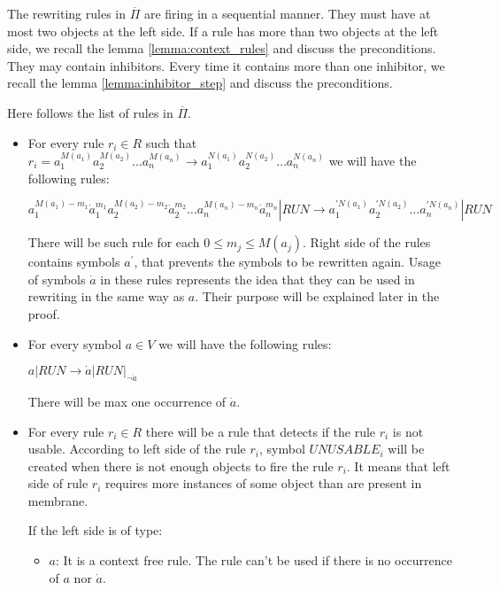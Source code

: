 \begin{dokaz}

  The rewriting rules in $\overline{\Pi}$ are firing in a sequential manner.
  They must have at most two objects at the left side. If a rule has more than two objects at the left side, we recall the lemma \ref{lemma:context_rules} and discuss the preconditions.
  They may contain inhibitors. Every time it contains more than one inhibitor, we recall the lemma \ref{lemma:inhibitor_step} and discuss the preconditions. 

  Here follows the list of rules in $\overline{\Pi}$.

  \begin{itemize}
    \item For every rule $r_i\in R$ such that $r_i = a_1^{M(a_1)}a_2^{M(a_2)}\dots a_n^{M(a_n)} \rightarrow a_1^{N(a_1)}a_2^{N(a_2)}\dots a_n^{N(a_n)}$ we will have the following rules:
  
    $a_1^{M(a_1)-m_1}\dot{a}_1^{m_1}a_2^{M(a_2)-m_2}\dot{a}_2^{m_2}\dots a_n^{M(a_n)-m_n}\dot{a}_n^{m_n}|RUN \rightarrow a_1^{\prime N(a_1)}a_2^{\prime N(a_2)}\dots a_n^{\prime N(a_n)}|RUN$

    There will be such rule for each $0\leq m_j\leq M(a_j)$.
    Right side of the rules contains symbols $a^\prime$, that prevents the symbols to be rewritten again.
    Usage of symbols $\dot{a}$ in these rules represents the idea that they can be used in rewriting in the same way as $a$. Their purpose will be explained later in the proof.

    \item For every symbol $a\in V$ we will have the following rules:

    $a|RUN \rightarrow \dot{a}|RUN|_{\neg \dot{a}}$

    There will be max one occurrence of $\dot{a}$.

    \item For every rule $r_i\in R$ there will be a rule that detects if the rule $r_i$ is not usable. According to left side of the rule $r_i$, symbol $UNUSABLE_i$ will be created when there is not enough objects to fire the rule $r_i$. It means that left side of rule $r_i$ requires more instances of some object than are present in membrane.

    If the left side is of type:
    \begin{itemize}
      \item $a$: It is a context free rule. The rule can't be used if there is no occurrence of $a$ nor $\dot{a}$.


\end{itemize}
\end{itemize}
\end{dokaz}
